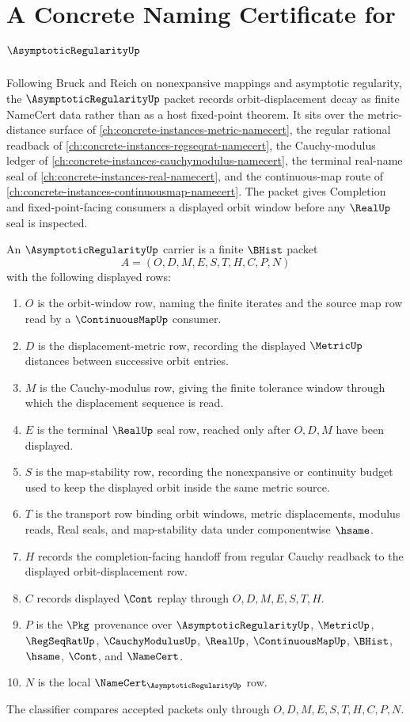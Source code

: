 \chapter{A Concrete Naming Certificate for $\AsymptoticRegularityUp$}
\label{ch:concrete-instances-asymptotic-regularity-namecert}

Following Bruck and Reich on nonexpansive mappings and asymptotic regularity, the $\AsymptoticRegularityUp$ packet records orbit-displacement decay as finite NameCert data rather than as a host fixed-point theorem. It sits over the metric-distance surface of \autoref{ch:concrete-instances-metric-namecert}, the regular rational readback of \autoref{ch:concrete-instances-regseqrat-namecert}, the Cauchy-modulus ledger of \autoref{ch:concrete-instances-cauchymodulus-namecert}, the terminal real-name seal of \autoref{ch:concrete-instances-real-namecert}, and the continuous-map route of \autoref{ch:concrete-instances-continuousmap-namecert}. The packet gives Completion and fixed-point-facing consumers a displayed orbit window before any $\RealUp$ seal is inspected.

\begin{definition}
\label{def:asymptotic-regularity-carrier}
An $\AsymptoticRegularityUp$ carrier is a finite $\BHist$ packet
$$
A=(O,D,M,E,S,T,H,C,P,N)
$$
with the following displayed rows:
\begin{enumerate}
\item $O$ is the orbit-window row, naming the finite iterates and the source map row read by a $\ContinuousMapUp$ consumer.
\item $D$ is the displacement-metric row, recording the displayed $\MetricUp$ distances between successive orbit entries.
\item $M$ is the Cauchy-modulus row, giving the finite tolerance window through which the displacement sequence is read.
\item $E$ is the terminal $\RealUp$ seal row, reached only after $O,D,M$ have been displayed.
\item $S$ is the map-stability row, recording the nonexpansive or continuity budget used to keep the displayed orbit inside the same metric source.
\item $T$ is the transport row binding orbit windows, metric displacements, modulus reads, Real seals, and map-stability data under componentwise $\hsame$.
\item $H$ records the completion-facing handoff from regular Cauchy readback to the displayed orbit-displacement row.
\item $C$ records displayed $\Cont$ replay through $O,D,M,E,S,T,H$.
\item $P$ is the $\Pkg$ provenance over $\AsymptoticRegularityUp$, $\MetricUp$, $\RegSeqRatUp$, $\CauchyModulusUp$, $\RealUp$, $\ContinuousMapUp$, $\BHist$, $\hsame$, $\Cont$, and $\NameCert$.
\item $N$ is the local $\NameCert_{\AsymptoticRegularityUp}$ row.
\end{enumerate}
The classifier compares accepted packets only through $O,D,M,E,S,T,H,C,P,N$.
\end{definition}

